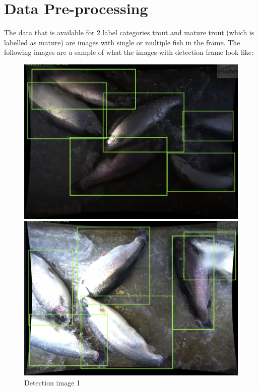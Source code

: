 \section{Data Pre-processing}

The data that is available for 2 label categories trout and mature trout (which is labelled as mature) are images with single or multiple fish in the frame. The following images are a sample of what the images with detection frame look like: 
\begin{figure}[H]
  \centering
  \begin{minipage}[b]{0.45\textwidth}
    \centering
    \includegraphics[width=\textwidth]{Figures/detection1.png}
    \caption{Detection image 1}
    \label{fig:detection1}
  \end{minipage}
  \hfill
  \begin{minipage}[b]{0.45\textwidth}
    \centering
    \includegraphics[width=\textwidth]{Figures/detection2.png}

\end{minipage}
\end{figure}
